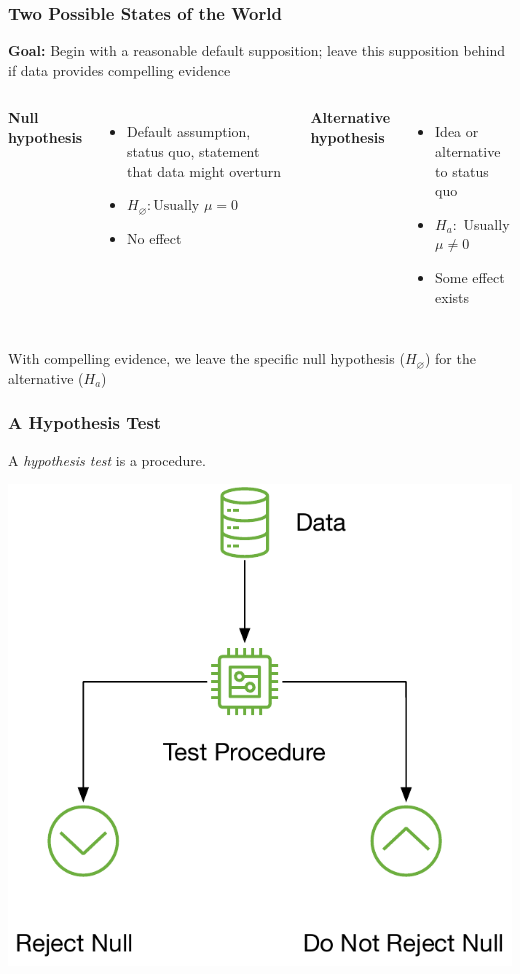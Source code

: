\documentclass[12pt, block=fill]{beamer}
\begin{document}
\begin{frame}
  \frametitle{Two Possible States of the World}
  \textbf{Goal:} Begin with a reasonable default supposition; leave
  this supposition behind if data provides compelling evidence
  \begin{columns}[t]
    \textbf{Null hypothesis}
    \begin{itemize}
    \item Default assumption, status quo, statement that data might overturn
    \item  $H_\varnothing: \text{Usually } \mu=0$
    \item No effect
    \end{itemize}
    \textbf{Alternative hypothesis}
    \begin{itemize}
    \item Idea or alternative to status quo
    \item $H_a:$ Usually  $\mu \neq 0$
    \item Some effect exists
    \end{itemize}
  \end{columns}
  
  With compelling evidence, we leave the specific null hypothesis
  ($H_{\varnothing}$) for the alternative ($H_{a}$)
\end{frame}

\begin{frame}
\frametitle{A Hypothesis Test}

A \textit{hypothesis test} is a procedure.

\begin{center}
  \includegraphics[width=.65\textwidth]{figures/test_procedure}
\end{center}
\end{frame}
\end{document}
